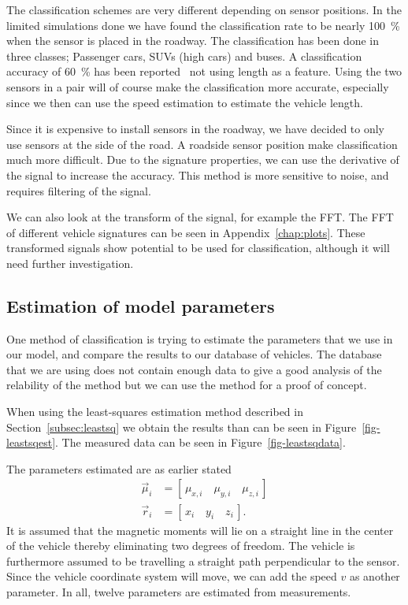 The classification schemes are very different depending on sensor positions. In the limited simulations done we have found the classification rate to be nearly 100~\% when the sensor is placed in the roadway. The classification has been done in three classes; Passenger cars, SUVs (high cars) and buses. A classification accuracy of 60~\% has been reported~\cite{cheung2005-2} not using length as a feature. Using the two sensors in a pair will of course make the classification more accurate, especially since we then can use the speed estimation to estimate the vehicle length.

Since it is expensive to install sensors in the roadway, we have decided to only use sensors at the side of the road. A roadside sensor position make classification much more difficult. Due to the signature properties, we can use the derivative of the signal to increase the accuracy. This method is more sensitive to noise, and requires filtering of the signal.

We can also look at the transform of the signal, for example the FFT. The FFT of different vehicle signatures can be seen in Appendix~\ref{chap:plots}. These transformed signals show potential to be used for classification, although it will need further investigation.

\subsection{Estimation of model parameters}\label{sec:leastsq_per}

One method of classification is trying to estimate the parameters that we use in our model, and compare the results to our database of vehicles. The database that we are using does not contain enough data to give a good analysis of the relability of the method but we can use the method for a proof of concept.

When using the least-squares estimation method described in Section~\ref{subsec:leastsq} we obtain the results than can be seen in Figure~\ref{fig-leastsqest}. The measured data can be seen in Figure~\ref{fig-leastsqdata}. 

The parameters estimated are as earlier stated
\begin{align}
	\vec{\mu}_i &= \left[\,\mu_{x,i}\quad{}\mu_{y,i}\quad{}\mu_{z,i}\,\right]\\
	\vec{r}_i &= \left[\,x_i\quad{}y_i\quad{}z_i\,\right].
\end{align}
It is assumed that the magnetic moments will lie on a straight line in the center of the vehicle thereby eliminating two degrees of freedom. The vehicle is furthermore assumed to be travelling a straight path perpendicular to the sensor. Since the vehicle coordinate system will move, we can add the speed $v$ as another parameter. In all, twelve parameters are estimated from measurements.

